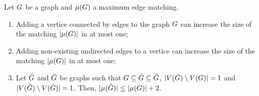 \documentclass[msc,english,table,xcdraw]{ppgccufmg}
\begin{document}
\begin{lemma}
\label{lem:matching_inc_one}
Let $G$ be a graph and $\mu(G)$ a maximum edge matching.
\begin{enumerate}
    \item Adding a vertice connected by edges to the graph $G$ can increase the size of the matching 
$|\mu(G)|$ in at most one; %
    \item Adding non-existing undirected edges to a vertice can increase the size of the matching 
$|\mu(G)|$ in at most one; %
    \item Let $\dot{G}$ and $\ddot{G}$ be graphs such that $G \subseteq \dot{G}
    \subseteq \ddot{G}$, $|V(\dot{G}) \setminus V(G)| = 1$
    and $|V(\ddot{G}) \setminus V(\dot{G}) | = 1$.
    Then, $|\mu(\ddot{G})| \leq |\mu(G)| + 2$.
\end{enumerate}
\end{lemma}
\end{document}
